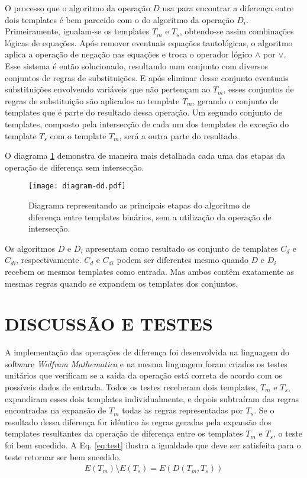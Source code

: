 O processo que o algoritmo da operação $D$ usa para encontrar a diferença entre dois templates é bem parecido com o do algoritmo da operação $D_{i}$. Primeiramente, igualam-se os templates $T_m$ e $T_s$, obtendo-se assim combinações lógicas de equações. Após remover eventuais equações tautológicas, o algoritmo aplica a operação de negação nas equações e troca o operador lógico $\wedge$ por $\vee$. Esse sistema é então solucionado, resultando num conjunto com diversos conjuntos de regras de substituições. E após eliminar desse conjunto eventuais substituições envolvendo variáveis que não pertençam ao $T_m$, esses conjuntos de regras de substituição são aplicados ao template $T_m$, gerando o conjunto de templates que é parte do resultado dessa operação. Um segundo conjunto de templates, composto pela intersecção de cada um dos templates de exceção do template $T_s$ com o template $T_m$, será a outra parte do resultado.

O diagrama \ref{fig:diagramInterDd} demonstra de maneira mais detalhada cada uma das etapas da operação de diferença sem intersecção.
\begin{figure}[h!]
  \centering
  \texttt{[image: diagram-dd.pdf]}
  \caption{Diagrama representando as principais etapas do algoritmo de diferença entre templates binários, sem a utilização da operação de intersecção.}
  \label{fig:diagramInterDd}
\end{figure}

Os algoritmos $D$ e $D_i$ apresentam como resultado os conjunto de templates $C_d$ e $C_{di}$, respectivamente. $C_d$ e $C_{di}$ podem ser diferentes mesmo quando $D$ e $D_i$ recebem os mesmos templates como entrada. Mas ambos contêm exatamente as mesmas regras quando se expandem os templates dos conjuntos.

\section{DISCUSSÃO E TESTES}
\label{sec:discussoesETestes}
A implementação das operações de diferença foi desenvolvida na linguagem do software \textit{Wolfram Mathematica} \cite{woframMathematica10} e na mesma linguagem foram criados os testes unitários que verificam se a saída da operação está correta de acordo com os possíveis dados de entrada. Todos os testes receberam dois templates, $T_m$ e $T_s$, expandiram esses dois templates individualmente, e depois subtraíram das regras encontradas na expansão de $T_m$ todas as regras representadas por $T_s$. Se o resultado dessa diferença for idêntico às regras geradas pela expansão dos templates resultantes da operação de diferença entre os templates $T_m$ e $T_s$, o teste foi bem sucedido. A Eq. \ref{eq:test} ilustra a igualdade que deve ser satisfeita para o teste retornar ser bem sucedido.
\begin{equation}
\begin{split}
E(T_m) \setminus E(T_s) = E(D(T_m,T_s))
\label{eq:test}
\end{split}
\end{equation}
\label{eq:operationsTemplateParidade}

